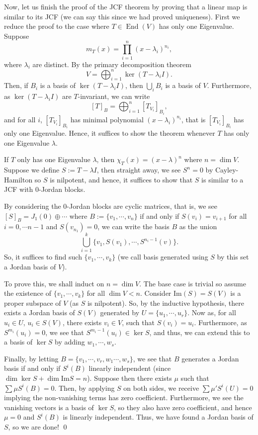 \documentclass[
]{article}
\theoremstyle{definition}
\theoremstyle{definition}
\begin{document}
Now, let us finish the proof of the JCF theorem by proving that a linear
map is similar to its JCF (we can say this since we had proved
uniqueness). \proof First we reduce the proof to the case where
\(T \in \mathop{\mathrm{End}}(V)\) has only one Eigenvalue. Suppose
\[m_T(x) = \prod_{i = 1}^n(x - \lambda_i)^{n_i},\] where \(\lambda_i\)
are distinct. By the primary decomposition theorem
\[V = \bigoplus_{i = 1}^n \ker (T - \lambda_i I).\] Then, if \(B_i\) is
a basis of \(\ker (T - \lambda_i I)\), then \(\bigcup_i B_i\) is a basis
of \(V\). Furthermore, as \(\ker (T - \lambda_i I)\) are
\(T\)-invariant, we can write
\[[T]_B = \bigoplus_{i = 1}^n [T_{V_i}]_{B_i},\] and for all \(i\),
\([T_{V_i}]_{B_i}\) has minimal polynomial \((x - \lambda_i)^{n_i}\),
that is \([T_{V_i}]_{B_i}\) has only one Eigenvalue. Hence, it suffices
to show the theorem whenever \(T\) has only one Eigenvalue \(\lambda\).

If \(T\) only has one Eigenvalue \(\lambda\), then
\(\chi_T(x) = (x - \lambda)^n\) where \(n = \dim V\). Suppose we define
\(S := T - \lambda I\), then straight away, we see \(S^n = 0\) by
Cayley-Hamilton so \(S\) is nilpotent, and hence, it suffices to show
that \(S\) is similar to a JCF with 0-Jordan blocks.

By considering the 0-Jordan blocks are cyclic matrices, that is, we see
\([S]_B = J_{1}(0) \oplus \cdots\) where \(B := \{v_1, \cdots, v_n\}\)
if and only if \(S(v_i) = v_{i + 1}\) for all \(i = 0, \cdots n - 1\)
and \(S(v_{n_1}) = 0\), we can write the basis \(B\) as the union
\[\bigcup_{i = 1}^k \{v_1, S(v_1), \cdots, S^{n_i - 1}(v)\}.\] So, it
suffices to find such \(\{v_1, \cdots, v_k\}\) (we call basis generated
using \(S\) by this set a Jordan basis of \(V\)).

To prove this, we shall induct on \(n = \dim V\). The base case is
trivial so assume the existence of \(\{v_1, \cdots, v_k\}\) for all
\(\dim V < n\). Consider \(\text{Im}(S) = S(V)\) is a proper subspace of
\(V\) (as \(S\) is nilpotent). So, by the inductive hypothesis, there
exists a Jordan basis of \(S(V)\) generated by
\(U = \{u_1, \cdots, u_r\}\). Now as, for all \(u_i \in U\),
\(u_i \in S(V)\), there exists \(v_i \in V\), such that
\(S(v_i) = u_i\). Furthermore, as \(S^{m_i}(u_i) = 0\), we see that
\(S^{m_i - 1}(u_i) \in \ker S\), and thus, we can extend this to a basis
of \(\ker S\) by adding \(w_1, \cdots, w_s\).

Finally, by letting \(B = \{v_1, \cdots, v_r, w_1 \cdots, w_s\}\), we
see that \(B\) generates a Jordan basis if and only if \(S^i(B)\)
linearly independent (since \(\dim \ker S + \dim \text{Im} S = n\)).
Suppose then there exists \(\mu\) such that \(\sum \mu S^i(B) = 0\).
Then, by applying \(S\) on both sides, we receive
\(\sum \mu'S^i(U) = 0\) implying the non-vanishing terms has zero
coefficient. Furthermore, we see the vanishing vectors is a basis of
\(\ker S\), so they also have zero coefficient, and hence \(\mu = 0\)
and \(S^i(B)\) is linearly independent. Thus, we have found a Jordan
basis of \(S\), so we are done! \qed
\end{document}
